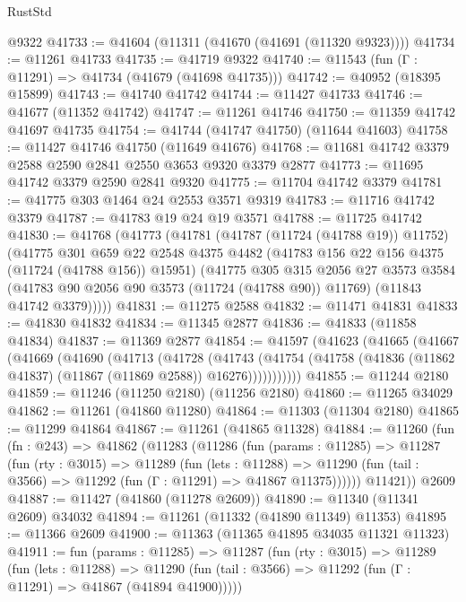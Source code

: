 \begin{lexlean}{RustStd}
\begin{coremodule}
    @9322
@41733 := @41604 (@11311 (@41670 (@41691 (@11320 @9323))))
@41734 := @11261 @41733
@41735 := @41719 @9322
@41740 := @11543 (fun (Γ : @11291) => @41734 (@41679 (@41698 @41735)))
@41742 := @40952 (@18395 @15899)
@41743 := @41740 @41742
@41744 := @11427 @41733
@41746 := @41677 (@11352 @41742)
@41747 := @11261 @41746
@41750 := @11359 @41742 @41697 @41735
@41754 := @41744 (@41747 @41750) (@11644 @41603)
@41758 := @11427 @41746 @41750 (@11649 @41676)
@41768 := @11681 @41742 @3379 @2588 @2590 @2841 @2550 @3653 @9320 @3379 @2877
@41773 := @11695 @41742 @3379 @2590 @2841 @9320
@41775 := @11704 @41742 @3379
@41781 := @41775 @303 @1464 @24 @2553 @3571 @9319
@41783 := @11716 @41742 @3379
@41787 := @41783 @19 @24 @19 @3571
@41788 := @11725 @41742
@41830 := @41768
    (@41773
      (@41781
        (@41787 (@11724 (@41788 @19)) @11752)
        (@41775
          @301
          @659
          @22
          @2548
          @4375
          @4482
          (@41783 @156 @22 @156 @4375 (@11724 (@41788 @156)) @15951)
          (@41775
            @305
            @315
            @2056
            @27
            @3573
            @3584
            (@41783 @90 @2056 @90 @3573 (@11724 (@41788 @90)) @11769)
            (@11843 @41742 @3379)))))
@41831 := @11275 @2588
@41832 := @11471 @41831
@41833 := @41830 @41832
@41834 := @11345 @2877
@41836 := @41833 (@11858 @41834)
@41837 := @11369 @2877
@41854 := @41597
    (@41623
      (@41665
        (@41667
          (@41669
            (@41690
              (@41713
                (@41728
                  (@41743
                    (@41754
                      (@41758 (@41836 (@11862 @41837) (@11867 (@11869 @2588)) @16276)))))))))))
@41855 := @11244 @2180
@41859 := @11246 (@11250 @2180) (@11256 @2180)
@41860 := @11265 @34029
@41862 := @11261 (@41860 @11280)
@41864 := @11303 (@11304 @2180)
@41865 := @11299 @41864
@41867 := @11261 (@41865 @11328)
@41884 := @11260
    (fun (fn : @243) =>
    @41862
      (@11283
        (@11286
          (fun (params : @11285) =>
          @11287
            (fun (rty : @3015) =>
            @11289
              (fun (lets : @11288) =>
              @11290 (fun (tail : @3566) => @11292 (fun (Γ : @11291) => @41867 @11375))))))
        @11421))
    @2609
@41887 := @11427 (@41860 (@11278 @2609))
@41890 := @11340 (@11341 @2609) @34032
@41894 := @11261 (@11332 (@41890 @11349) @11353)
@41895 := @11366 @2609
@41900 := @11363 (@11365 @41895 @34035 @11321 @11323)
@41911 := fun (params : @11285) =>
  @11287
    (fun (rty : @3015) =>
    @11289
      (fun (lets : @11288) =>
      @11290 (fun (tail : @3566) => @11292 (fun (Γ : @11291) => @41867 (@41894 @41900)))))

\end{coremodule}
\end{lexlean}
